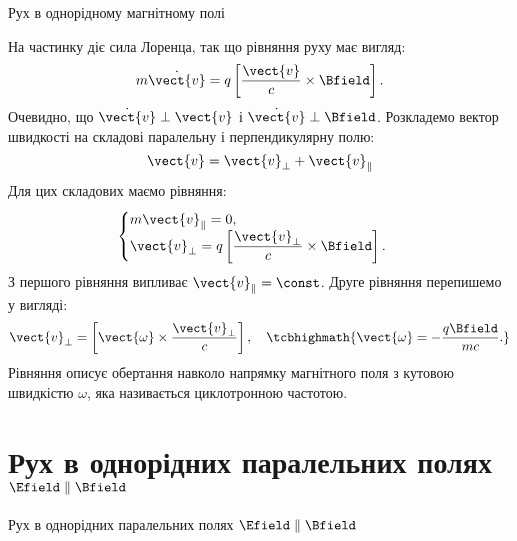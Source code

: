 \documentclass[onlytextwidth]{beamer}
\begin{document}
\begin{frame}{Рух в однорідному магнітному полі}{}
	\begin{block}{}
		На частинку діє сила Лоренца, так що рівняння руху має вигляд:
		\begin{equation*}
			m\dot{\vect{v}} = q\left[\frac{\vect{v}}{c}\times\Bfield\right].
		\end{equation*}
		Очевидно, що $\dot{\vect{v}}\perp\vect{v}$ і $\dot{\vect{v}}\perp\Bfield$. Розкладемо вектор швидкості на
		складові паралельну і перпендикулярну полю:
		\begin{equation*}
			\vect{v} = \vect{v}_{\perp} + \vect{v}_{\parallel}
		\end{equation*}
		Для цих складових маємо рівняння:
		\begin{equation*}
			\begin{cases}
				m\vect{v}_{\parallel} = 0, \\
				\vect{v}_{\perp} = q\left[\dfrac{\vect{v}_{\perp}}{c}\times\Bfield\right].
			\end{cases}
		\end{equation*}
		З першого рівняння випливає $\vect{v}_{\parallel} = \const$.
Друге рівняння перепишемо у вигляді:
\begin{equation*}
    \vect{v}_{\perp} = \left[\vect{\omega}\times\dfrac{\vect{v}_{\perp}}{c}\right],\quad \tcbhighmath{\vect{\omega} = - \frac{q\Bfield}{mc}.}
\end{equation*}
Рівняння описує обертання навколо напрямку магнітного поля з кутовою швидкістю $\omega$, яка називається \alert{ циклотронною частотою}.
	\end{block}
\end{frame}



\section{Рух в однорідних паралельних полях \texorpdfstring{$\Efield\parallel\Bfield $}{E||B}}



\begin{frame}{Рух в однорідних паралельних полях $\Efield\parallel\Bfield $}{}

\end{frame}
\end{document}

